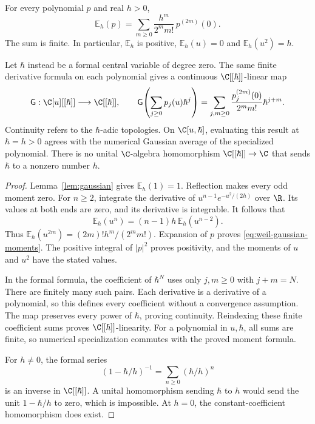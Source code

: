 \begin{proposition}
\label{prop:weil-gaussian-comparison}
For every polynomial $p$ and real $h>0$,
\begin{equation}
 \mathbb E_h(p)
 =\sum_{m\geq0}\frac{h^m}{2^m m!}\,p^{(2m)}(0).
 \label{eq:weil-gaussian-moments}
\end{equation}
The sum is finite.  In particular, $\mathbb E_h$ is positive,
$\mathbb E_h(u)=0$ and $\mathbb E_h(u^2)=h$.

Let $\hbar$ instead be a formal central variable of degree zero.
The same finite derivative formula on each polynomial gives a continuous
$\C[[\hbar]]$-linear map
\[
 \mathsf G:\C[u][[\hbar]]\longrightarrow\C[[\hbar]],\qquad
 \mathsf G\!\left(\sum_{j\geq0}p_j(u)\hbar^j\right)
  =\sum_{j,m\geq0}\frac{p_j^{(2m)}(0)}{2^m m!}\hbar^{j+m}.
\]
Continuity refers to the $\hbar$-adic topologies.
On $\C[u,\hbar]$, evaluating this result at $\hbar=h>0$ agrees
with the numerical Gaussian average of the specialized polynomial.
There is no unital $\C$-algebra homomorphism
$\C[[\hbar]]\to\C$ that sends $\hbar$ to a nonzero number $h$.
\end{proposition}
\begin{proof}
Lemma~\ref{lem:gaussian} gives $\mathbb E_h(1)=1$.
Reflection makes every odd moment zero.
For $n\geq2$, integrate the derivative of
$u^{n-1}e^{-u^2/(2h)}$ over $\R$.
Its values at both ends are zero, and its derivative is integrable.
It follows that
\[
 \mathbb E_h(u^n)=(n-1)h\,\mathbb E_h(u^{n-2}).
\]
Thus
$\mathbb E_h(u^{2m})=(2m)!h^m/(2^m m!)$.
Expansion of $p$ proves \eqref{eq:weil-gaussian-moments}.
The positive integral of $|p|^2$ proves positivity, and the moments
of $u$ and $u^2$ have the stated values.

In the formal formula, the coefficient of $\hbar^N$ uses only
$j,m\geq0$ with $j+m=N$.  There are finitely many such pairs.
Each derivative is a derivative of a polynomial, so this defines every
coefficient without a convergence assumption.
The map preserves every power of $\hbar$, proving continuity.
Reindexing these finite coefficient sums proves
$\C[[\hbar]]$-linearity.  For a polynomial in $u,\hbar$, all sums are
finite, so numerical specialization commutes with the proved moment formula.

For $h\ne0$, the formal series
\[
 (1-\hbar/h)^{-1}=\sum_{n\geq0}(\hbar/h)^n
\]
is an inverse in $\C[[\hbar]]$.
A unital homomorphism sending $\hbar$ to $h$ would send the unit
$1-\hbar/h$ to zero, which is impossible.
At $h=0$, the constant-coefficient homomorphism does exist.
\end{proof}

